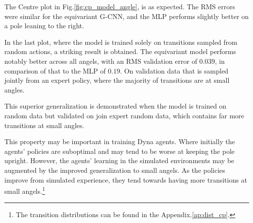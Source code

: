 The Centre plot in Fig.\ref{fig:cp_model_angle}, is as expected. The RMS errors were similar for the equivariant G-CNN, and the MLP performs slightly better on a pole leaning to the right.

In the last plot, where the model is trained solely on transitions sampled from random actions, a striking result is obtained. The equivariant model performs notably better across all angels, with an RMS validation error of $0.039$, in comparison of that to the MLP of $0.19$. On validation data that is sampled jointly from an expert policy, where the majority of transitions are at small angles.

This superior generalization is demonstrated when the model is trained on random data but validated on join expert random data, which contains far more transitions at small angles.

This property may be important in training Dyna agents. Where initially the agents' policies are suboptimal and may tend to be worse at keeping the pole upright. However, the agents' learning in the simulated environments may be augmented by the improved generalization to small angels. As the policies improve from simulated experience, they tend towards having more transitions at small angels.\footnote{The transition distributions can be found in the Appendix.\ref{ap:dist_cp}.}

